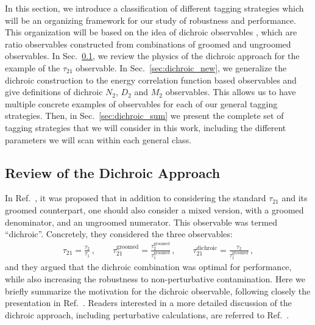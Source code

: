 \documentclass[11pt,letterpaper]{article}
\newcommand{\groomed}{\text{groomed}}
\DeclareRobustCommand{\Sec}[1]{Sec.~\ref{#1}}
\DeclareRobustCommand{\Ref}[1]{Ref.~\cite{#1}}
\begin{document}
In this section, we introduce a classification of different tagging strategies which will be an organizing framework for our study of robustness and performance.
%
This organization will be based on the idea of dichroic observables \cite{Salam:2016yht}, which are ratio observables constructed from combinations of groomed and ungroomed observables.
%
In \Sec{sec:dichroic}, we review the physics of the dichroic approach for the example of the $\tau_{21}$ observable.
%
In \Sec{sec:dichroic_new}, we generalize the dichroic construction to the energy correlation function based observables and give definitions of dichroic $N_2$, $D_2$ and $M_2$ observables.
%
This allows us to have multiple concrete examples of observables for each of our general tagging strategies.
%
Then, in \Sec{sec:dichroic_sum} we present the complete set of tagging strategies that we will consider in this work, including the different parameters we will scan within each general class.



\subsection{Review of the Dichroic Approach}\label{sec:dichroic}


In \Ref{Salam:2016yht}, it was proposed that in addition to considering the standard $\tau_{21}$ and its groomed counterpart, one should also consider a mixed version, with a groomed denominator, and an ungroomed numerator.
%
This observable was termed ``dichroic''.
%
Concretely, they considered the three observables:
%
\begin{align}
 \tau_{21} =\frac{\tau_2}{\tau_1}  \,, \qquad \tau_{21}^{\text{groomed}} =\frac{\tau_2^\groomed}{\tau_1^\groomed}\,, \qquad \tau_{21}^{\text{dichroic}} =\frac{\tau_2}{\tau_1^\groomed}\,,
\end{align}
%
and they argued that the dichroic combination was optimal for performance, while also increasing the robustness to non-perturbative contamination.
%
Here we briefly summarize the motivation for the dichroic observable, following closely the presentation in \Ref{Salam:2016yht}. 
%
Readers interested in a more detailed discussion of the dichroic approach, including perturbative calculations, are referred to \Ref{Salam:2016yht}.
\end{document}
